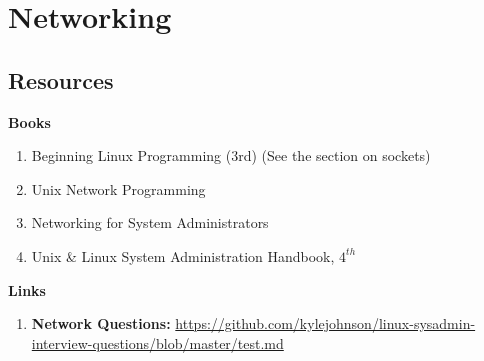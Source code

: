 \newcommand{\uls}{Unix \& Linux System Administration Handbook, $4^{th}$}
\chapter{Networking}
\section{Resources}
	\textbf{Books}
		\begin{enumerate}
			\item Beginning Linux Programming (3rd) (See the section on sockets)
			\item Unix Network Programming
			\item Networking for System Administrators
			\item \uls
		\end{enumerate}
	\textbf{Links}
		\begin{enumerate}
			\item \textbf{Network Questions: } \url{https://github.com/kylejohnson/linux-sysadmin-interview-questions/blob/master/test.md}
		\end{enumerate}

